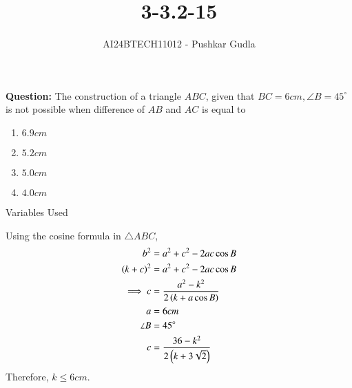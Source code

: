 \documentclass[journal]{IEEEtran}
\begin{document}

\vspace{3cm}

\title{3-3.2-15}
\author{AI24BTECH11012 - Pushkar Gudla}
{\let\newpage\relax\maketitle}

\renewcommand{\thefigure}{\theenumi}
\renewcommand{\thetable}{\theenumi}
\setlength{\intextsep}{10pt} %


\renewcommand{\thetable}{\theenumi}
\textbf{Question:} The construction of a triangle $ABC$, given that $BC=6cm, \angle B=45^\circ$ is not possible when difference of $AB$ and $AC$ is equal to\begin{enumerate}
	\item $6.9cm$
	\item $5.2cm$
	\item $5.0cm$
	\item $4.0cm$
\end{enumerate}
\solution
\begin{table}[h!]    
  \centering
  
  \caption{Variables Used}
  \label{tab 3.2.15}
\end{table}
Using the cosine formula in $\triangle ABC$,\\
\begin{align}
	b^2 &= a^2 + c^2 - 2ac\cos B \\
	\left(k+c\right)^2 &= a^2 + c^2 - 2ac\cos B \\
	\implies c &= \frac{a^2 - k^2}{2\left(k + a\cos B\right)}\\
	a &= 6cm \\
	\angle B &= 45^\circ \\
	c &= \frac{36-k^2}{2\left(k + 3\sqrt{2}\right)}\\	
\end{align}
Therefore, $k \leq 6cm $.
\end{document}
